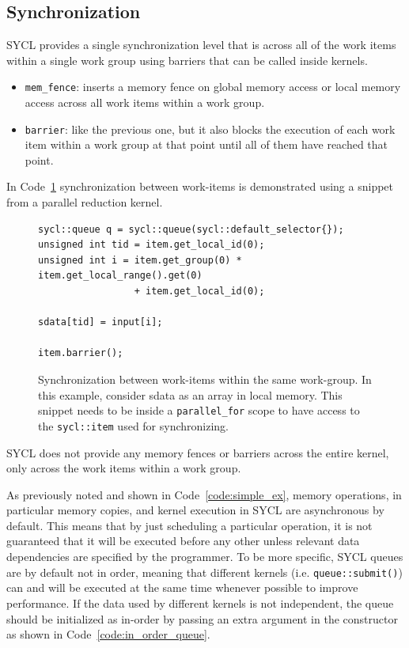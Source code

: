 \subsection{Synchronization}
\label{ch:synchronization}
SYCL provides a single synchronization level that is across all of the work items within a single work group using barriers that can be called inside kernels.
\begin{itemize}
    \item \texttt{mem\_fence}: inserts a memory fence on global memory access or local memory access across all work items within a work group.
    \item \texttt{barrier}: like the previous one, but it also blocks the execution of each work item within a work group at that point until all of them have reached that point.
\end{itemize}
In Code~\ref{code:item_barriers} synchronization between work-items is demonstrated using a snippet from a parallel reduction kernel.

\begin{figure}[ht!]
\renewcommand{\figurename}{Code}
\begin{verbatim}
sycl::queue q = sycl::queue(sycl::default_selector{});
unsigned int tid = item.get_local_id(0);
unsigned int i = item.get_group(0) * item.get_local_range().get(0) 
                 + item.get_local_id(0);

sdata[tid] = input[i];

item.barrier();
\end{verbatim}
\caption{Synchronization between work-items within the same work-group. In this example, consider sdata as an array in local memory. This snippet needs to be inside a \texttt{parallel\_for} scope to have access to the \texttt{sycl::item} used for synchronizing.}
\label{code:item_barriers}
\end{figure}

SYCL does not provide any memory fences or barriers across the entire kernel, only across the work items within a work group.

As previously noted and shown in Code~\ref{code:simple_ex}, memory operations, in particular memory copies, and kernel execution in SYCL are asynchronous by default. This means that by just scheduling a particular operation, it is not guaranteed that it will be executed before any other unless relevant data dependencies are specified by the programmer. To be more specific, SYCL queues are by default not in order, meaning that different kernels (i.e. \texttt{queue::submit()}) can and will be executed at the same time whenever possible to improve performance.
If the data used by different kernels is not independent, the queue should be initialized as in-order by passing an extra argument in the constructor as shown in Code~\ref{code:in_order_queue}.

